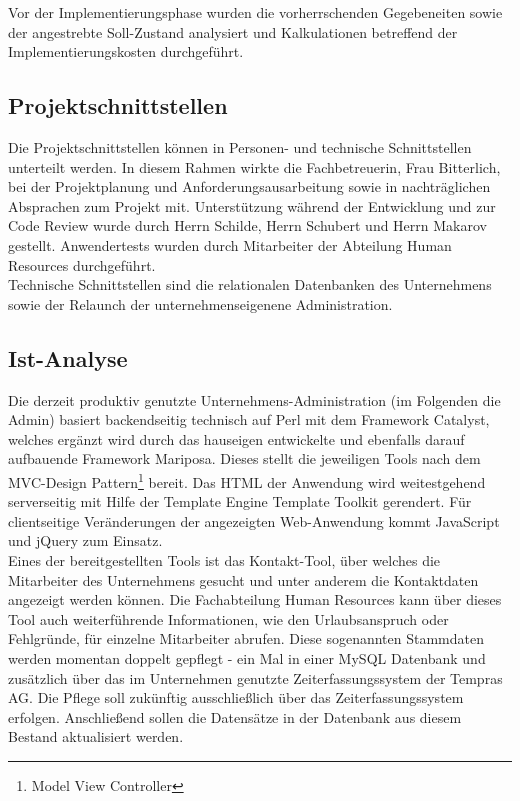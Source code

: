 Vor der Implementierungsphase wurden die vorherrschenden Gegebeneiten sowie der angestrebte Soll-Zustand analysiert und   Kalkulationen betreffend der Implementierungskosten durchgeführt.

\subsection{Projektschnittstellen}
    Die Projektschnittstellen können in Personen- und technische Schnittstellen unterteilt werden. In diesem Rahmen wirkte die Fachbetreuerin, Frau Bitterlich, bei der Projektplanung und Anforderungsausarbeitung sowie in nachträglichen Absprachen zum Projekt mit. Unterstützung während der Entwicklung und zur Code Review wurde durch Herrn Schilde, Herrn Schubert und Herrn Makarov gestellt. Anwendertests wurden durch Mitarbeiter der Abteilung Human Resources durchgeführt.\\
    Technische Schnittstellen sind die relationalen Datenbanken des Unternehmens sowie der Relaunch der unternehmenseigenene Administration.

\subsection{Ist-Analyse}
    Die derzeit produktiv genutzte Unternehmens-Administration (im Folgenden \glqq die Admin\grqq{}) basiert backendseitig technisch auf Perl mit dem Framework \glqq Catalyst\grqq{}, welches ergänzt wird durch das hauseigen entwickelte und ebenfalls darauf aufbauende Framework \glqq Mariposa\grqq{}. \mbox{Dieses} stellt die jeweiligen Tools nach dem MVC-Design Pattern\footnote{Model View Controller} bereit. Das HTML der Anwendung wird weitestgehend serverseitig mit Hilfe der Template Engine \glqq Template Toolkit\grqq{} gerendert. Für clientseitige Veränderungen der angezeigten Web-Anwendung kommt JavaScript und jQuery zum Einsatz.\\
    Eines der bereitgestellten Tools ist das Kontakt-Tool, über welches die Mitarbeiter des Unternehmens gesucht und unter anderem die Kontaktdaten angezeigt werden können. Die Fachabteilung Human Resources kann über dieses Tool auch weiterführende Informationen, wie den Urlaubsanspruch oder Fehlgründe, für einzelne Mitarbeiter abrufen. Diese sogenannten Stammdaten werden momentan doppelt gepflegt - ein Mal in einer MySQL Datenbank und zusätzlich über das im Unternehmen genutzte Zeiterfassungssystem der Tempras AG. Die \mbox{Pflege} soll zukünftig ausschließlich über das Zeiterfassungssystem erfolgen. Anschließend \mbox{sollen} die Datensätze in der Datenbank aus diesem Bestand aktualisiert werden.\\

